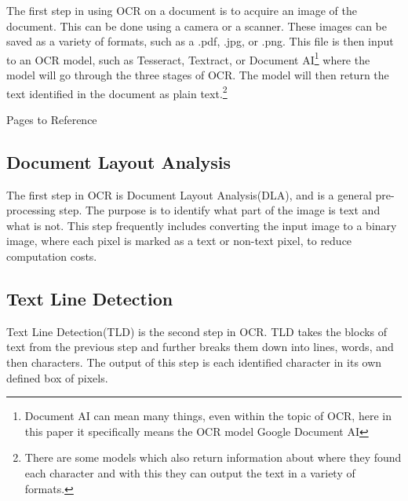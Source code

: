 \documentclass[sigplan,screen,nonacm]{acmart-tagged}
\begin{document}
The first step in using OCR on a document is to acquire an image of the document. This can be done using a camera or a scanner. These images can be saved as a variety of formats, such as a .pdf, .jpg, or .png. This file is then input to an OCR model, such as Tesseract, Textract, or Document AI\footnote{Document AI can mean many things, even within the topic of OCR, here in this paper it specifically means the OCR model Google Document AI} where the model will go through the three stages of OCR. The model will then return the text identified in the document as plain text.\footnote{There are some models which also return information about where they found each character and with this they can output the text in a variety of formats.} 

Pages to Reference\cite{Raj:2022,Avyodri:2022,Thorat:2022}

\subsection{Document Layout Analysis}
\label{DLA}

The first step in OCR is Document Layout Analysis(DLA), and is a general pre-processing step. The purpose is to identify what part of the image is text and what is not. 
This step frequently includes converting the input image to a binary image, where each pixel is marked as a text or non-text pixel, to reduce computation costs.

\subsection{Text Line Detection}
\label{TLD}

Text Line Detection(TLD) is the second step in OCR. TLD takes the blocks of text from the previous step and further breaks them down into lines, words, and then characters. The output of this step is each identified character in its own defined box of pixels.

\end{document}
